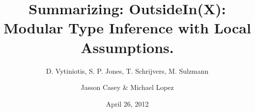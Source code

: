 \documentclass{beamer}
\title{Summarizing: OutsideIn(X): Modular Type Inference with Local Assumptions.}
\subtitle{D. Vytiniotis, S. P. Jones, T. Schrijvers, M. Sulzmann}
\author{Jasson Casey \& Michael Lopez}
\date{April 26, 2012}
\begin{document}
\begin{frame}
\titlepage
\end{frame}

\begin{frame}
\end{frame}
\end{document}
